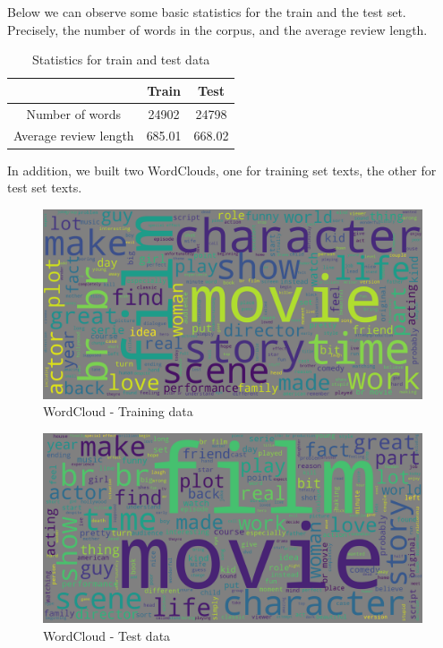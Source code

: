 \documentclass[fleqn,10pt]{SelfArx} %
\begin{document}

Below we can observe some basic statistics for the train and the test set. Precisely, the number of words in the corpus, and the average review length.

\begin{table}[ht]
\centering
\begin{tabular}{c c c }
	 & Train & Test  \\
	\hline
	Number of words & 24902 & 24798  \\
	Average review length & 685.01 & 668.02  \\
\end{tabular}
\caption{Statistics for train and test data}
\end{table}

In addition, we built two WordClouds, one for training set texts, the other for test set texts.

\begin{figure}[H]
\begin{center}
  \includegraphics[scale=0.1]{./images/WordCloud_train.png}
\end{center}
  \caption{WordCloud - Training data}
\end{figure}

\begin{figure}[H]
\begin{center}
  \includegraphics[scale=0.1]{./images/WordCloud_test.png}
\end{center}
  \caption{WordCloud - Test data}
\end{figure}
\end{document}
